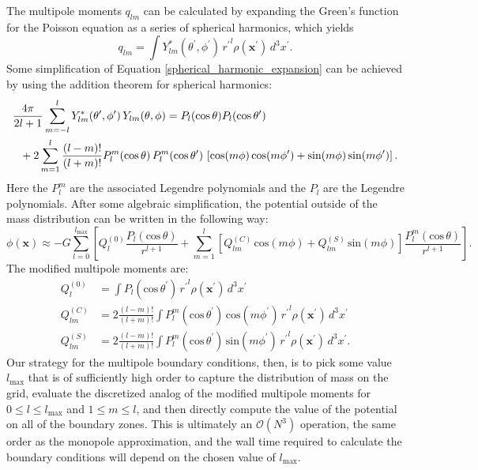 \begin{itemize}
The multipole moments $q_{lm}$ can be calculated by expanding the
Green's function for the Poisson equation as a series of spherical
harmonics, which yields
\begin{equation}
  q_{lm} = \int Y^*_{lm}(\theta^\prime, \phi^\prime)\, {r^\prime}^l \rho(\mathbf{x}^\prime)\, d^3x^\prime. \label{multipole_moments_original}
\end{equation}
Some simplification of Equation \ref{spherical_harmonic_expansion} can
be achieved by using the addition theorem for spherical harmonics:
\begin{align}
  &\frac{4\pi}{2l+1} \sum_{m=-l}^{l} Y^*_{lm}(\theta^\prime,\phi^\prime)\, Y_{lm}(\theta, \phi) = P_l(\text{cos}\, \theta) P_l(\text{cos}\, \theta^\prime) \notag \\
  &\ \ + 2 \sum_{m=1}^{l} \frac{(l-m)!}{(l+m)!} P_{l}^{m}(\text{cos}\, \theta)\, P_{l}^{m}(\text{cos}\, \theta^\prime)\, \left[\text{cos}(m\phi)\, \text{cos}(m\phi^\prime) + \text{sin}(m\phi)\, \text{sin}(m\phi^\prime)\right].
\end{align}
Here the $P_{l}^{m}$ are the associated Legendre polynomials and the
$P_l$ are the Legendre polynomials. After some algebraic
simplification, the potential outside of the mass distribution can be
written in the following way:
\begin{equation}
  \phi(\mathbf{x}) \approx -G\sum_{l=0}^{l_{\text{max}}} \left[Q_l^{(0)} \frac{P_l(\text{cos}\, \theta)}{r^{l+1}} + \sum_{m = 1}^{l}\left[ Q_{lm}^{(C)}\, \text{cos}(m\phi) + Q_{lm}^{(S)}\, \text{sin}(m\phi)\right] \frac{P_{l}^{m}(\text{cos}\, \theta)}{r^{l+1}} \right].
\end{equation}
The modified multipole moments are:
\begin{align}
  Q_l^{(0)}   &= \int P_l(\text{cos}\, \theta^\prime)\, {r^{\prime}}^l \rho(\mathbf{x}^\prime)\, d^3 x^\prime \\
  Q_{lm}^{(C)} &= 2\frac{(l-m)!}{(l+m)!} \int P_{l}^{m}(\text{cos}\, \theta^\prime)\, \text{cos}(m\phi^\prime)\, {r^\prime}^l \rho(\mathbf{x}^\prime)\, d^3 x^\prime \\
  Q_{lm}^{(S)} &= 2\frac{(l-m)!}{(l+m)!} \int P_{l}^{m}(\text{cos}\, \theta^\prime)\, \text{sin}(m\phi^\prime)\, {r^\prime}^l \rho(\mathbf{x}^\prime)\, d^3 x^\prime.
\end{align}
Our strategy for the multipole boundary conditions, then, is to pick
some value $l_{\text{max}}$ that is of sufficiently high order to
capture the distribution of mass on the grid, evaluate the discretized
analog of the modified multipole moments for $0 \leq l \leq
l_{\text{max}}$ and $1 \leq m \leq l$, and then directly compute the
value of the potential on all of the boundary zones. This is
ultimately an $\mathcal{O}(N^3)$ operation, the same order as the
monopole approximation, and the wall time required to calculate the
boundary conditions will depend on the chosen value of
$l_{\text{max}}$.


\end{itemize}
